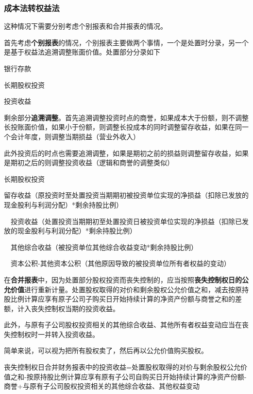 \documentclass[UTF8,12pt]{ctexart}
\newenvironment{Dr}{%
	\begin{list}{}%
		{
			\setlength{\leftmargin}{2em}
			\setlength{\labelwidth}{2em}
			\setlength{\labelsep}{0pt}
			\setlength{\itemindent}{0pt}
			\setlength{\listparindent}{0pt}
			\setlength{\parsep}{0pt}
			\setlength{\topsep}{0pt}
		}
		\item[\textbf{借：}]
	}{%
	\end{list}
}
\newenvironment{Cr}{%
	\begin{list}{}%
		{
			\setlength{\leftmargin}{2em}
			\setlength{\labelwidth}{2em}
			\setlength{\labelsep}{0pt}
			\setlength{\itemindent}{0pt}
			\setlength{\listparindent}{0pt}
			\setlength{\parsep}{0pt}
			\setlength{\topsep}{0pt}
		}
		\item[\textbf{贷：}]
	}{%
	\end{list}
}
\numberwithin{equation}{section} %
\numberwithin{figure}{section}
\numberwithin{table}{section}
\begin{document}
	
	\subsubsection{成本法转权益法}
	这种情况下需要分别考虑个别报表和合并报表的情况。
	
	首先考虑\textbf{个别报表}的情况，个别报表主要做两个事情，一个是处置时分录，另一个是基于权益法追溯调整账面价值。处置部分分录如下
	
	\begin{Dr}
		银行存款
	\end{Dr}
	\begin{Cr}
		长期股权投资
		
		投资收益
	\end{Cr}
	
	剩余部分\textbf{追溯调整}。首先追溯调整投资时点的商誉，如果成本大于份额，则不调整长投账面价值，如果小于份额，则调整长投成本的同时调整留存收益，如果在同一个会计年度，则调整当期损益（营业外收入）
	
	此外投资后的时点也需要追溯调整，如果是期初之前的损益则调整留存收益，如果是期初之后的则调整投资收益（逻辑和商誉的调整类似）
	
	\begin{Dr}
		长期股权投资
	\end{Dr}
	\begin{Cr}
		留存收益（原投资时至处置投资当期期初被投资单位实现的净损益（扣除已发放的现金股利与利润分配）*剩余持股比例）
		
		\ \ 投资收益（处置投资当期期初至处置投资日被投资单位实现的净损益（扣除已发放的现金股利与利润分配）*剩余持股比例）
		
		\ \ 其他综合收益（被投资单位其他综合收益变动*剩余持股比例）
		
		\ \ 资本公积-其他资本公积（其他原因导致的被投资单位所有者权益的变动）
	\end{Cr}
	
	在\textbf{合并报表}中，因为处置部分股权投资而丧失控制的，应当按照\textbf{丧失控制权日的公允价值}进行重新计量。处置股权取得的对价和剩余股权公允价值之和，减去按原持股比例计算应享有原子公司子购买日开始持续计算的净资产份额与商誉之和的差额，计入丧失控制权当期的投资收益。
	
	此外，与原有子公司股权投资相关的其他综合收益、其他所有者权益变动应当在丧失控制权时一并转入投资收益。
	
	简单来说，可以视为把所有股权卖了，然后再以公允价值购买股权。
	
	丧失控制权日合并财务报表中的投资收益=处置股权取得的对价与剩余股权公允价值之和-按原持股比例计算应享有原有子公司自购买日开始持续计算的净资产份额-商誉+与原有子公司股权投资相关的其他综合收益、其他权益变动
	
\end{document}
